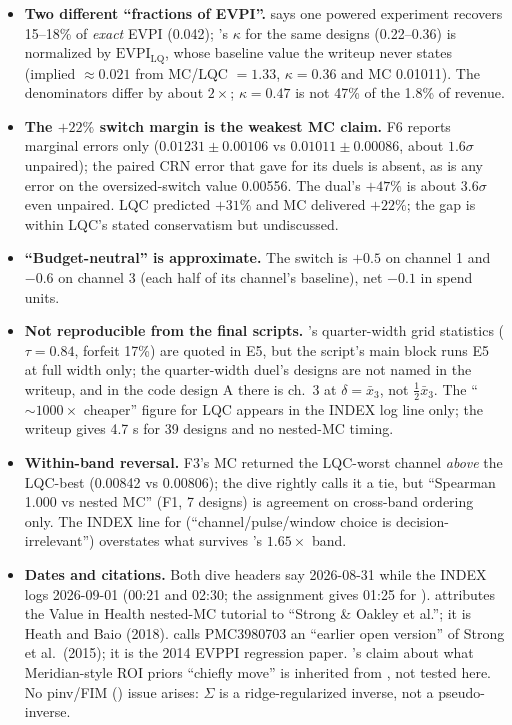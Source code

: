 \begin{reviewernote}[(compiler)]
\begin{itemize}[leftmargin=1.2em]
\item \textbf{Two different ``fractions of EVPI''.}  says one powered experiment recovers 15--18\% of \emph{exact} EVPI (0.042); 's $\kappa$ for the same designs (0.22--0.36) is normalized by $\mathrm{EVPI}_{\mathrm{LQ}}$, whose baseline value the writeup never states (implied $\approx 0.021$ from MC/LQC $= 1.33$, $\kappa = 0.36$ and MC 0.01011). The denominators differ by about $2\times$; $\kappa = 0.47$ is not 47\% of the 1.8\% of revenue.
\item \textbf{The $+22\%$ switch margin is the weakest MC claim.} F6 reports marginal errors only ($0.01231 \pm 0.00106$ vs $0.01011 \pm 0.00086$, about $1.6\sigma$ unpaired); the paired CRN error that  gave for its duels is absent, as is any error on the oversized-switch value 0.00556. The dual's $+47\%$ is about $3.6\sigma$ even unpaired. LQC predicted $+31\%$ and MC delivered $+22\%$; the gap is within LQC's stated conservatism but undiscussed.
\item \textbf{``Budget-neutral'' is approximate.} The switch is $+0.5$ on channel 1 and $-0.6$ on channel 3 (each half of its channel's baseline), net $-0.1$ in spend units.
\item \textbf{Not reproducible from the final scripts.} 's quarter-width grid statistics ($\tau = 0.84$, forfeit 17\%) are quoted in E5, but the script's main block runs E5 at full width only; the quarter-width duel's designs are not named in the writeup, and in the code design A there is ch.\ 3 at $\delta = \bar x_3$, not $\tfrac12\bar x_3$. The ``$\sim 1000\times$ cheaper'' figure for LQC appears in the INDEX log line only; the writeup gives 4.7 s for 39 designs and no nested-MC timing.
\item \textbf{Within-band reversal.} F3's MC returned the LQC-worst channel \emph{above} the LQC-best (0.00842 vs 0.00806); the dive rightly calls it a tie, but ``Spearman 1.000 vs nested MC'' (F1, 7 designs) is agreement on cross-band ordering only. The INDEX line for  (``channel/pulse/window choice is decision-irrelevant'') overstates what survives 's $1.65\times$ band.
\item \textbf{Dates and citations.} Both dive headers say 2026-08-31 while the INDEX logs 2026-09-01 (00:21 and 02:30; the assignment gives 01:25 for ).  attributes the Value in Health nested-MC tutorial to ``Strong \& Oakley et al.''; it is Heath and Baio (2018).  calls PMC3980703 an ``earlier open version'' of Strong et al.\ (2015); it is the 2014 EVPPI regression paper. 's claim about what Meridian-style ROI priors ``chiefly move'' is inherited from , not tested here. No pinv/FIM () issue arises: $\Sigma$ is a ridge-regularized inverse, not a pseudo-inverse.
\end{itemize}
\end{reviewernote}

